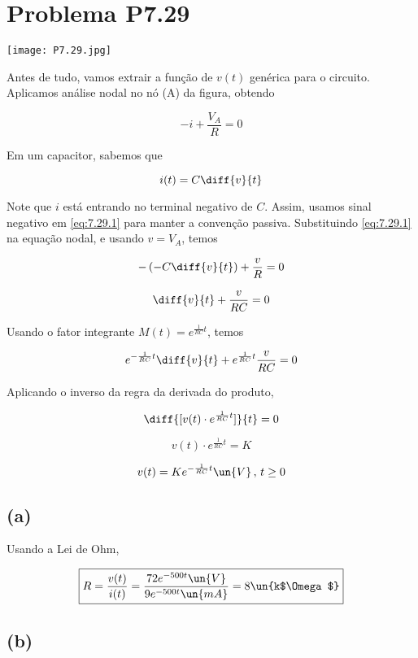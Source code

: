 
\section*{Problema P7.29}

\renewcommand*\thesection{7.29}

\begin{center}
    \texttt{[image: P7.29.jpg]}
\end{center}

Antes de tudo, vamos extrair a função de $v(t)$ genérica para o circuito. 
Aplicamos análise nodal no nó (A) da figura, obtendo    

\[ -i + \frac{V_A}{R} = 0 \]

Em um capacitor, sabemos que 

\begin{equation}\label{eq:7.29.1}
    i(t) = C\diff{v}{t}
\end{equation}

Note que $i$ está entrando no terminal negativo de $C$. Assim, usamos sinal negativo em \eqref{eq:7.29.1} para manter a 
convenção passiva. Substituindo \eqref{eq:7.29.1} na equação nodal, e usando $v = V_A$, temos   

\[ -\left(-C\diff{v}{t}\right) + \frac{v}{R} = 0 \]

\[ \diff{v}{t} + \frac{v}{RC} = 0 \]

Usando o fator integrante $M(t) = e^{\frac{1}{RC}t}$, temos   

\[ e^{-\frac{1}{RC}t}\diff{v}{t} + e^{\frac{1}{RC}t}\frac{v}{RC} = 0 \]

Aplicando o inverso da regra da derivada do produto,

\[ \diff{[v(t) \cdot e^{\frac{1}{RC}t}]}{t} = 0 \]

\[ v(t) \cdot e^{\frac{1}{RC}t} = K \]

\begin{equation}\label{eq:7.29.2}
    v(t) = Ke^{-\frac{1}{RC}t} \un{V} \, , \, t \geq 0
\end{equation}

\subsection*{(a)}

Usando a Lei de Ohm,  

\[ \boxed{R = \frac{v(t)}{i(t)} = \frac{72e^{-500t} \un{V}}{9e^{-500t} \un{mA}} = 8\un{k$\Omega$}}  \]

\subsection*{(b)}


